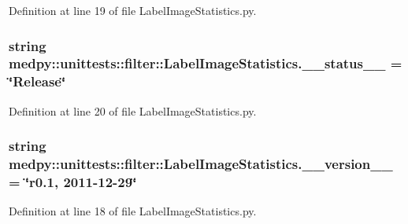 Definition at line 19 of file LabelImageStatistics.py.

\hypertarget{namespacemedpy_1_1unittests_1_1filter_1_1LabelImageStatistics_a0af7c06dbb6bf6b1f5debfbdfa8dbf91}{
\subsubsection[{\_\-\_\-status\_\-\_\-}]{\setlength{\rightskip}{0pt plus 5cm}string {\bf medpy::unittests::filter::LabelImageStatistics.\_\-\_\-status\_\-\_\-} = \char`\"{}Release\char`\"{}}}
\label{namespacemedpy_1_1unittests_1_1filter_1_1LabelImageStatistics_a0af7c06dbb6bf6b1f5debfbdfa8dbf91}


Definition at line 20 of file LabelImageStatistics.py.

\hypertarget{namespacemedpy_1_1unittests_1_1filter_1_1LabelImageStatistics_a2ad83f6bb6e9d052c0b8ecfb48a27d3b}{
\subsubsection[{\_\-\_\-version\_\-\_\-}]{\setlength{\rightskip}{0pt plus 5cm}string {\bf medpy::unittests::filter::LabelImageStatistics.\_\-\_\-version\_\-\_\-} = \char`\"{}r0.1, 2011-\/12-\/29\char`\"{}}}
\label{namespacemedpy_1_1unittests_1_1filter_1_1LabelImageStatistics_a2ad83f6bb6e9d052c0b8ecfb48a27d3b}


Definition at line 18 of file LabelImageStatistics.py.

